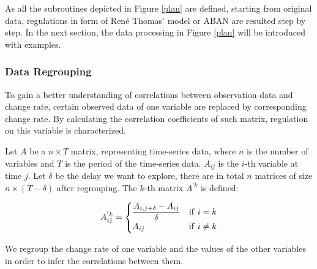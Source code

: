 As all the subroutines depicted in Figure \ref{plan} are defined, starting from original data, regulations in form of Ren\'e Thomas' model \cite{thomas1978} or ABAN are resulted step by step. In the next section, the data processing in Figure \ref{plan} will be introduced with examples.

\subsubsection*{Data Regrouping}
To gain a better understanding of correlations between observation data and change rate, certain observed data of one variable are replaced by corresponding change rate. By calculating the correlation coefficients of such matrix, regulation on this variable is characterized.

\begin{definition}[Regrouping]
    Let $A$ be a $n\times T$ matrix, representing time-series data, where $n$ is the number of variables and $T$ is the period of the time-series data.
    $A_{ij}$ is the $i$-th variable at time $j$. 
    Let $\delta$ be the delay we want to explore, there are in total $n$ matrices of size $n\times (T-\delta)$ after regrouping.
    The $k$-th matrix $A^{'k}$ is defined:
    
    \begin{equation}
    \nonumber
    A^{'k}_{ij}=
    \begin{cases}
        \dfrac{A_{i,j+\delta}-A_{ij}}{\delta} & {\rm if\ } i=k\\
         A_{ij} & {\rm if\ } i\neq k
    \end{cases}
\end{equation}
\end{definition}

We regroup the change rate of one variable and the values of the other variables in order to infer the correlations between them.

